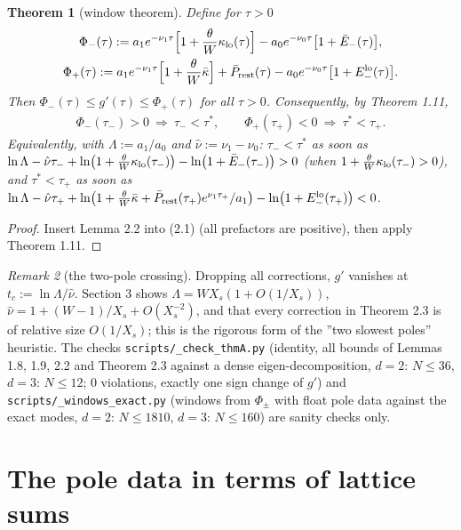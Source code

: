 \documentclass[11pt,a4paper]{article}
\newtheorem{theorem}{Theorem}[section]
\theoremstyle{definition}
\theoremstyle{remark}
\newtheorem{remark}[theorem]{Remark}
\begin{document}
\begin{theorem}[{window theorem}]
Define for $\tau>0$
\begin{gather*}
\Phi_-(\tau):=a_1e^{-\nu_1\tau}\Bigl[1+\frac\theta W\kappa_{\rm lo}(\tau)\Bigr]-a_0e^{-\nu_0\tau}\bigl[1+\bar E_-(\tau)\bigr], \\
\Phi_+(\tau):=a_1e^{-\nu_1\tau}\Bigl[1+\frac\theta W\bar\kappa\Bigr]+\bar P_{\rm rest}(\tau)-a_0e^{-\nu_0\tau}\bigl[1+E_-^{\rm lo}(\tau)\bigr].
\end{gather*}
Then $\Phi_-(\tau)\le g'(\tau)\le\Phi_+(\tau)$ for all $\tau>0$. Consequently, by Theorem 1.11,
\begin{gather*}
\Phi_-(\tau_-)>0\ \Longrightarrow\ \tau_-<\tau^*, \qquad \Phi_+(\tau_+)<0\ \Longrightarrow\ \tau^*<\tau_+ .
\end{gather*}
Equivalently, with $\Lambda:=a_1/a_0$ and $\hat\nu:=\nu_1-\nu_0$: $\tau_-<\tau^*$ as soon as $\ln\Lambda-\hat\nu\tau_-+\ln\bigl(1+\frac\theta W\kappa_{\rm lo}(\tau_-)\bigr)-\ln\bigl(1+\bar E_-(\tau_-)\bigr)>0$ (when $1+\frac\theta W\kappa_{\rm lo}(\tau_-)>0$), and $\tau^*<\tau_+$ as soon as $\ln\Lambda-\hat\nu\tau_++\ln\bigl(1+\frac\theta W\bar\kappa+\bar P_{\rm rest}(\tau_+)e^{\nu_1\tau_+}/a_1\bigr)-\ln\bigl(1+E_-^{\rm lo}(\tau_+)\bigr)<0$.
\end{theorem}

\begin{proof}
Insert Lemma 2.2 into (2.1) (all prefactors are positive), then apply Theorem 1.11.
\end{proof}

\begin{remark}[{the two-pole crossing}]
Dropping all corrections, $g'$ vanishes at $t_c:=\ln\Lambda/\hat\nu$. Section 3 shows $\Lambda=WX_s(1+O(1/X_s))$, $\hat\nu=1+(W-1)/X_s+O(X_s^{-2})$, and that every correction in Theorem 2.3 is of relative size $O(1/X_s)$; this is the rigorous form of the ''two slowest poles'' heuristic. The checks \texttt{scripts/\_\allowbreak check\_\allowbreak thmA.py} (identity, all bounds of Lemmas 1.8, 1.9, 2.2 and Theorem 2.3 against a dense eigen-decomposition, $d=2$: $N\le36$, $d=3$: $N\le12$; 0 violations, exactly one sign change of $g'$) and \texttt{scripts/\_\allowbreak windows\_\allowbreak exact.py} (windows from $\Phi_\pm$ with float pole data against the exact modes, $d=2$: $N\le1810$, $d=3$: $N\le160$) are sanity checks only.
\end{remark}

\setcounter{section}{2}
\section{The pole data in terms of lattice sums}
\end{document}

